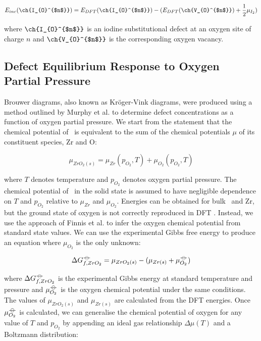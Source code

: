 \begin{equation}
\label{o_sub_incorp_equation}
E_{inc}(\ch{I_{O}^{$n$}}) = E_{DFT}(\ch{I_{O}^{$n$}}) - (E_{DFT}(\ch{V_{O}^{$n$}}) + \frac{1}{2}\mu_{I_{2}})  %
\end{equation}

where $\ch{I_{O}^{$n$}}$ is an iodine substitutional defect at an oxygen site of charge $n$ and $\ch{V_{O}^{$n$}}$ is the corresponding oxygen vacancy.


\subsection{Defect Equilibrium Response to Oxygen Partial Pressure}

Brouwer diagrams, also known as Kr{\"o}ger-Vink diagrams, were produced using a method outlined by Murphy et al. \cite{Murphy2014} to determine defect concentrations as a function of oxygen partial pressure. We start from the statement that the chemical potential of \zirconia\ is equivalent to the sum of the chemical potentials $\mu$ of its constituent species, Zr and O:

\begin{equation}
{\mu}_{ZrO_2(s)} = {\mu}_{Zr}(p_{O_2}, T) + {\mu}_{O_2}(p_{O_2}, T)
\label{mewZrO2results2}
\end{equation}

where $T$ denotes temperature and $p_{O_2}$ denotes oxygen partial pressure. The chemical potential of \zirconia\ in the solid state is assumed to have negligible dependence on $T$ and $p_{O_2}$ relative to ${\mu}_{Zr}$ and ${\mu}_{O_2}$. Energies can be obtained for bulk \zirconia\ and Zr, but the ground state of oxygen is not correctly reproduced in DFT \cite{Batyrev2000,Lozovoi2001}. Instead, we use the approach of Finnis et al. \cite{Finnis2005} to infer the oxygen chemical potential from standard state values. We can use the experimental Gibbs free energy to produce an equation where $\mu_{O_2}$ is the only unknown:

\begin{equation}
\Delta{G^{{\ensuremath{-\kern-4pt{\ominus}\kern-4pt-}}}_{f, ZrO_2}} = \mu_{ZrO_2(s)} - (\mu_{Zr(s)} + \mu^{{-\kern-4pt{\ominus}\kern-4pt-}}_{O_2})
\end{equation}

where $\Delta{G^{{\ensuremath{-\kern-4pt{\ominus}\kern-4pt-}}}_{f, ZrO_2}}$ is the experimental Gibbs energy at standard temperature and pressure and $\mu^{{-\kern-4pt{\ominus}\kern-4pt-}}_{O_2}$ is the oxygen chemical potential under the same conditions. The values of $\mu_{ZrO_2(s)}$ and $\mu_{Zr(s)}$ are calculated from the DFT energies. Once $\mu^{{-\kern-4pt{\ominus}\kern-4pt-}}_{O_2}$ is calculated, we can generalise the chemical potential of oxygen for any value of $T$ and $p_{O_2}$ by appending an ideal gas relationship $\Delta{\mu(T)}$ and a Boltzmann distribution:

